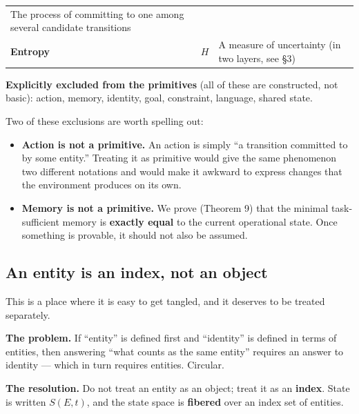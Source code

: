 \documentclass[11pt]{article}
\providecommand{\tightlist}{%
  \setlength{\itemsep}{0pt}\setlength{\parskip}{0pt}}
\begin{document}
\begin{longtable}[]{@{}lll@{}}
\begin{minipage}[t]{0.30\columnwidth}
The process of committing to one among several candidate transitions\strut
\end{minipage}\tabularnewline
\begin{minipage}[t]{0.30\columnwidth}\raggedright
\textbf{Entropy}\strut
\end{minipage} & \begin{minipage}[t]{0.30\columnwidth}\raggedright
\(H\)\strut
\end{minipage} & \begin{minipage}[t]{0.30\columnwidth}\raggedright
A measure of uncertainty (in two layers, see \S{}3)\strut
\end{minipage}\tabularnewline
\bottomrule
\end{longtable}

\textbf{Explicitly excluded from the primitives} (all of these are constructed, not basic): action, memory, identity, goal, constraint, language, shared state.

Two of these exclusions are worth spelling out:

\begin{itemize}
\tightlist
\item
  \textbf{Action is not a primitive.} An action is simply ``a transition committed to by some entity.'' Treating it as primitive would give the same phenomenon two different notations and would make it awkward to express changes that the environment produces on its own.
\item
  \textbf{Memory is not a primitive.} We prove (Theorem 9) that the minimal task-sufficient memory is \textbf{exactly equal} to the current operational state. Once something is provable, it should not also be assumed.
\end{itemize}

\hypertarget{an-entity-is-an-index-not-an-object}{%
\subsection{An entity is an index, not an object}\label{an-entity-is-an-index-not-an-object}}

This is a place where it is easy to get tangled, and it deserves to be treated separately.

\textbf{The problem.} If ``entity'' is defined first and ``identity'' is defined in terms of entities, then answering ``what counts as the same entity'' requires an answer to identity --- which in turn requires entities. Circular.

\textbf{The resolution.} Do not treat an entity as an object; treat it as an \textbf{index}. State is written \(S(E,t)\), and the state space is \textbf{fibered} over an index set of entities.
\end{document}

